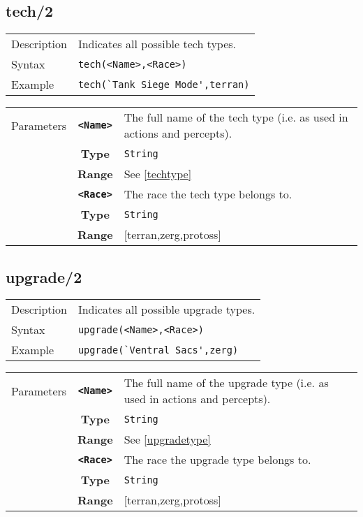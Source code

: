 \subsection{tech/2}
\begin{tabularx}{\textwidth}{lX}
 Description & Indicates all possible tech types. \\
 Syntax & \verb|tech(<Name>,<Race>)| \\
 Example & \verb|tech(`Tank Siege Mode',terran)| \\
 \end{tabularx}
 \begin{tabularx}{\textwidth}{l | c | p{8cm}|}
 \cline{2-3}
 Parameters & \textbf{\verb|<Name>|} & The full name of the tech type (i.e. as used in actions and percepts). \\
            & \textbf{Type} & \verb|String| \\
            & \textbf{Range} & See \ref{techtype} \\
            \cline{2-3}
 			& \textbf{\verb|<Race>|} & The race the tech type belongs to.\\
            & \textbf{Type} & \verb|String| \\
            & \textbf{Range} & [terran,zerg,protoss] \\
            \cline{2-3}
\end{tabularx}

\subsection{upgrade/2}
\begin{tabularx}{\textwidth}{lX}
 Description & Indicates all possible upgrade types. \\
 Syntax & \verb|upgrade(<Name>,<Race>)| \\
 Example & \verb|upgrade(`Ventral Sacs',zerg)| \\
 \end{tabularx}
 \begin{tabularx}{\textwidth}{l | c | p{8cm}|}
 \cline{2-3}
 Parameters & \textbf{\verb|<Name>|} & The full name of the upgrade type (i.e. as used in actions and percepts). \\
            & \textbf{Type} & \verb|String| \\
            & \textbf{Range} & See \ref{upgradetype} \\
            \cline{2-3}
 			& \textbf{\verb|<Race>|} & The race the upgrade type belongs to.\\
            & \textbf{Type} & \verb|String| \\
            & \textbf{Range} & [terran,zerg,protoss] \\
            \cline{2-3}
\end{tabularx}

